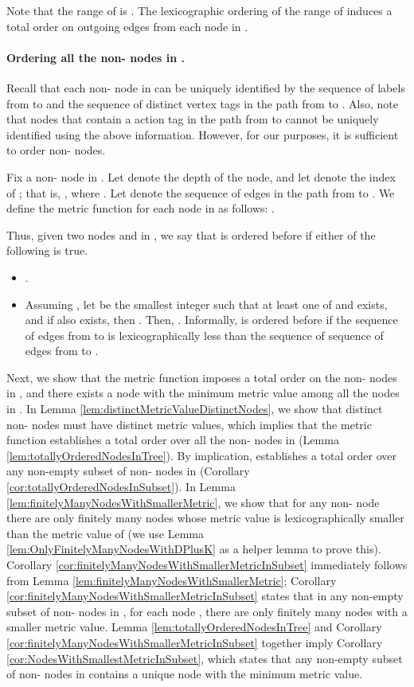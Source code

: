 \documentclass[11pt]{article}
\numberwithin{theorem}{section}
\begin{document}
Note that the range of  is . The lexicographic ordering of the range of  induces a total order on outgoing edges from each node in .







\paragraph{Ordering all the non- nodes in .}
Recall that each non- node  in  can be uniquely identified by the sequence of labels from  to  and the sequence of distinct vertex tags in the path from  to . Also, note that nodes that contain a  action tag in the path from  to  cannot be uniquely identified using the above information. However, for our purposes, it is sufficient to order non- nodes.

Fix a non- node  in . Let  denote the depth of the node, and let  denote the index of ; that is, , where . Let  denote the sequence of edges in the path from  to . We define the metric function for each node  in  as follows: .

Thus, given two nodes  and  in , we say that  is ordered before  if either of the following is true.
\begin{itemize}
\item .
\item Assuming , let  be the smallest integer such that at least one of  and  exists, and if  also exists, then  . Then, . Informally,  is ordered before  if the sequence of edges from  to  is lexicographically less than the sequence of sequence of edges from  to . 
\end{itemize}

Next, we show that the metric function  imposes a total order on the non- nodes in , and there exists a node with the minimum metric value among all the nodes in .
In Lemma \ref{lem:distinctMetricValueDistinctNodes}, we show that distinct non- nodes must have distinct metric values, which implies that the metric function  establishes a total order over all the non- nodes in  (Lemma \ref{lem:totallyOrderedNodesInTree}).
By implication,  establishes a total order over any non-empty subset of non- nodes in  (Corollary \ref{cor:totallyOrderedNodesInSubset}).
In Lemma \ref{lem:finitelyManyNodesWithSmallerMetric}, we show that for any non- node  there are only finitely many nodes whose metric value is lexicographically smaller than the metric value of  (we use Lemma \ref{lem:OnlyFinitelyManyNodesWithDPlusK} as a helper lemma to prove this). 
Corollary \ref{cor:finitelyManyNodesWithSmallerMetricInSubset} immediately follows from Lemma \ref{lem:finitelyManyNodesWithSmallerMetric};  Corollary \ref{cor:finitelyManyNodesWithSmallerMetricInSubset} states that in any non-empty subset of non- nodes in , for each node , there are only finitely many nodes with a smaller metric value. Lemma \ref{lem:totallyOrderedNodesInTree} and Corollary \ref{cor:finitelyManyNodesWithSmallerMetricInSubset} together imply Corollary \ref{cor:NodesWithSmallestMetricInSubset}, which states that any non-empty subset  of non- nodes in  contains a unique node with the minimum metric value.
\end{document}

